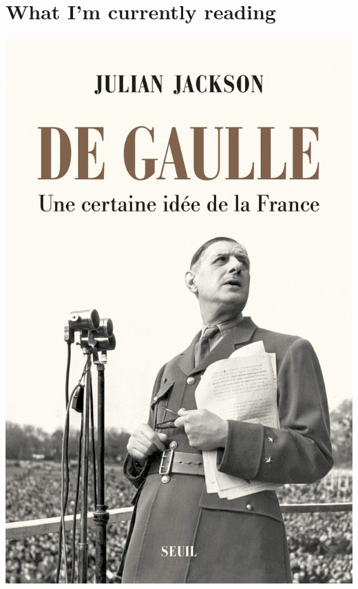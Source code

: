 \documentclass[11pt]{article}
\begin{document}
\section{What I'm currently reading}
\label{sec:org3f28031}

\begin{center}
\includegraphics[width=.9\linewidth]{img/books/jackson-de-gaulle.jpg}
\end{center}
\end{document}
